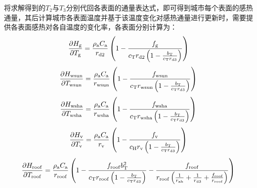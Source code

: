 将求解得到的$T_{2}$与$T_{3}$分别代回各表面的通量表达式，即可得到城市每个表面的感热通量，其后计算城市各表面温度并基于该温度变化对感热通量进行更新时，需要提供各表面感热对各自温度的变化率，各表面分别计算为：
\begin{equation}
  \frac{\partial H_{\mathrm{g}}}{\partial T_{\mathrm{g}}} = \frac{\rho _{\rm a} C_{\mathrm a}}{r_{\mathrm{d2}}} \left(1-\frac{f_{\rm g}}{c_{\mathrm{T}} r_{\mathrm{d2}} \left(1-\frac{b_{\mathrm {T}} }{c_{\mathrm{T}} r_{\mathrm{d3}}}\right)}\right)
\end{equation}
%
\begin{equation}
  \frac{\partial H_{\mathrm{wsun}}}{\partial T_{\mathrm{wsun}}} = \frac{\rho _{\rm a} C_{\mathrm a}}{r_{\mathrm{wsun}}} \left(1-\frac{f_{\mathrm{wsun}}}{c_{\mathrm{T}} r_{\mathrm{wsun}} \left(1-\frac{b_{\mathrm {T}} }{c_{\mathrm{T}} r_{\mathrm{d3}}}\right)}\right)
\end{equation}
%
\begin{equation}
  \frac{\partial H_{\mathrm{wsha}}}{\partial T_{\mathrm{wsha}}} = \frac{\rho _{\rm a} C_{\mathrm a}}{r_{\mathrm{wsha}}} \left(1-\frac{f_{\mathrm{wsha}}}{c_{\mathrm{T}} r_{\mathrm{wsha}} \left(1-\frac{b_{\mathrm {T}} }{c_{\mathrm{T}} r_{\mathrm{d3}}}\right)}\right)
\end{equation}
%
\begin{equation}
  \frac{\partial H_{\mathrm{v}}}{\partial T_{\mathrm{v}}} = \frac{\rho _{\rm a} C_{\mathrm a}}{r_{\mathrm{v}}} \left(1-\frac{f_{\mathrm{v}}}{c_{\mathrm{H}} r_{\mathrm{v}} \left(1-\frac{b_{\mathrm {T}} }{c_{\mathrm{T}} r_{\mathrm{d3}}}\right)}\right)
\end{equation}
%
\begin{equation}
  \frac{\partial H_{\mathrm{roof}}}{\partial T_{\mathrm{roof}}} = \frac{\rho _{\rm a} C_{\mathrm a}}{r_{\mathrm{roof}}} \left(1-\frac{f_{\mathrm{roof}} b_{\mathrm{T}}^2}{c_{\mathrm{T}} r_{\mathrm{roof}} \left(1-\frac{b_{\mathrm {T}} }{c_{\mathrm{T}} r_{\mathrm{d3}}}\right)}-\frac{f_{\mathrm{roof}}}{r_{\mathrm{roof}}\left(\frac{1}{r_{\mathrm{ah}}}+\frac{1}{r_{\mathrm{d3}}}+\frac{f_{\mathrm{roof}}}{r_{\mathrm{roof}}}\right)}\right)
\end{equation}

